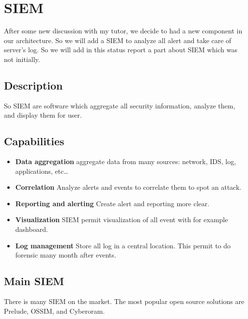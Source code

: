 
\chapter{SIEM}
\label{chap:project}

After some new discussion with my tutor, we decide to had a new component in our architecture. So we will add a
SIEM to analyze all alert and take care of server's log. So we will add in this status report a part about SIEM
which was not initially.

\section{Description}



So SIEM are software which aggregate all security information, analyze them, and display them for user.

\section{Capabilities}

\begin{itemize}
\item \textbf{Data aggregation} aggregate data from many sources: network, IDS, log, applications, etc\dots
\item \textbf{Correlation} Analyze alerts and events to correlate them to spot an attack.
\item \textbf{Reporting and alerting} Create alert and reporting more clear.
\item \textbf{Visualization} SIEM permit visualization of all event with for example dashboard.
\item \textbf{Log management} Store all log in a central location. This permit to do forensic many month after
  events.
\end{itemize}


\section{Main SIEM}

There is many SIEM on the market. The most popular open source solutions are Prelude, OSSIM, and Cyberoram.






